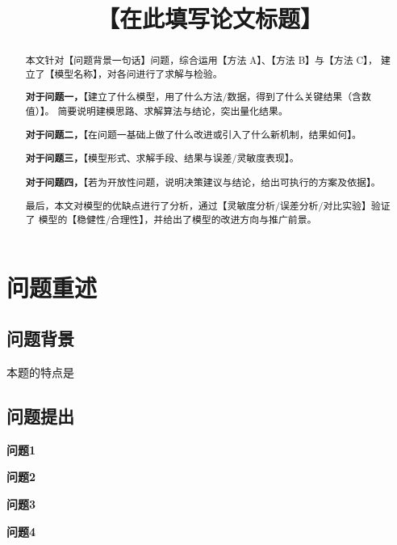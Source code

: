 \documentclass[withoutpreface,bwprint]{cumcmthesis}
\title{【在此填写论文标题】}
\begin{document}
\maketitle                     %

\begin{abstract}

本文针对【问题背景一句话】问题，综合运用【方法 A】、【方法 B】与【方法 C】，
建立了【模型名称】，对各问进行了求解与检验。

\textbf{对于问题一，}【建立了什么模型，用了什么方法/数据，得到了什么关键结果（含数值）】。
简要说明建模思路、求解算法与结论，突出量化结果。

\textbf{对于问题二，}【在问题一基础上做了什么改进或引入了什么新机制，结果如何】。

\textbf{对于问题三，}【模型形式、求解手段、结果与误差/灵敏度表现】。

\textbf{对于问题四，}【若为开放性问题，说明决策建议与结论，给出可执行的方案及依据】。

最后，本文对模型的优缺点进行了分析，通过【灵敏度分析/误差分析/对比实验】验证了
模型的【稳健性/合理性】，并给出了模型的改进方向与推广前景。

\end{abstract}


\section{问题重述}

\subsection{问题背景}

本题的特点是\textbf{}
\subsection{问题提出}

\textbf{问题1}

\textbf{问题2}

\textbf{问题3}

\textbf{问题4}

\newpage
\end{document}
